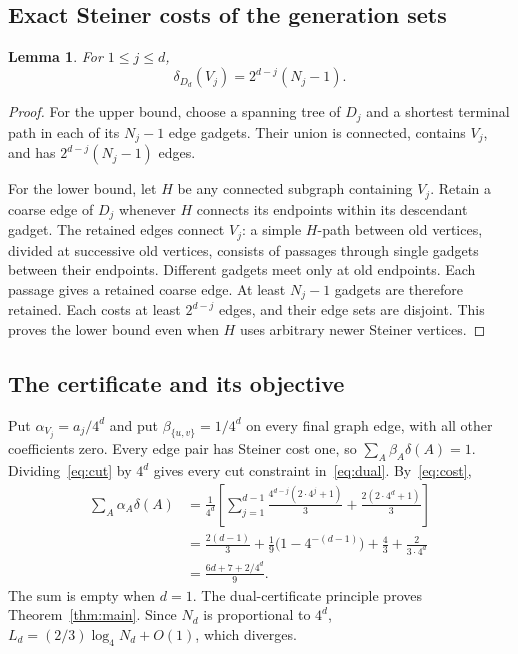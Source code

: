 \documentclass[11pt]{article}
\newtheorem{lemma}[theorem]{Lemma}
\begin{document}
\subsection{Exact Steiner costs of the generation sets}
\begin{lemma}\label{lem:cost}
For $1\le j\le d$,
\begin{equation}\label{eq:cost}
\delta_{D_d}(V_j)=2^{d-j}(N_j-1).
\end{equation}
\end{lemma}
\begin{proof}
For the upper bound, choose a spanning tree of $D_j$ and a shortest terminal
path in each of its $N_j-1$ edge gadgets. Their union is connected, contains
$V_j$, and has $2^{d-j}(N_j-1)$ edges.

For the lower bound, let $H$ be any connected subgraph containing $V_j$.
Retain a coarse edge of $D_j$ whenever $H$ connects its endpoints within
its descendant gadget. The retained edges connect $V_j$: a simple $H$-path
between old vertices, divided at successive old vertices, consists of
passages through single gadgets between their endpoints. Different gadgets
meet only at old endpoints. Each passage gives a retained coarse edge.
At least $N_j-1$ gadgets are therefore retained. Each costs at least
$2^{d-j}$ edges, and their edge sets are disjoint. This proves the lower
bound even when $H$ uses arbitrary newer Steiner vertices.
\end{proof}

\subsection{The certificate and its objective}
Put $\alpha_{V_j}=a_j/4^d$ and put $\beta_{\{u,v\}}=1/4^d$ on every final
graph edge, with all other coefficients zero. Every edge pair has Steiner
cost one, so $\sum_A\beta_A\delta(A)=1$. Dividing~\eqref{eq:cut} by $4^d$
gives every cut constraint in~\eqref{eq:dual}. By~\eqref{eq:cost},
\begin{align*}
\sum_A\alpha_A\delta(A)
&=\frac1{4^d}\left[\sum_{j=1}^{d-1}
  \frac{4^{d-j}(2\cdot4^j+1)}3+\frac{2(2\cdot4^d+1)}3\right]\\
&=\frac{2(d-1)}3+\frac19\bigl(1-4^{-(d-1)}\bigr)
  +\frac43+\frac2{3\cdot4^d}\\
&=\frac{6d+7+2/4^d}{9}.
\end{align*}
The sum is empty when $d=1$. The dual-certificate principle proves
Theorem~\ref{thm:main}. Since $N_d$ is proportional to $4^d$,
$L_d=(2/3)\log_4N_d+O(1)$, which diverges.
\end{document}

